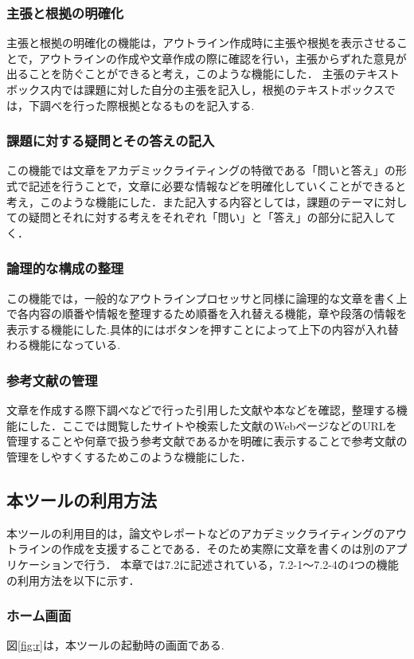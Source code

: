 \documentclass[a4j,12pt]{jarticle}
\begin{document}
\subsubsection{主張と根拠の明確化}
主張と根拠の明確化の機能は，アウトライン作成時に主張や根拠を表示させることで，アウトラインの作成や文章作成の際に確認を行い，主張からずれた意見が出ることを防ぐことができると考え，このような機能にした．
主張のテキストボックス内では課題に対した自分の主張を記入し，根拠のテキストボックスでは，下調べを行った際根拠となるものを記入する.

\subsubsection{課題に対する疑問とその答えの記入}
この機能では文章をアカデミックライティングの特徴である「問いと答え」の形式で記述を行うことで，文章に必要な情報などを明確化していくことができると考え，このような機能にした．また記入する内容としては，課題のテーマに対しての疑問とそれに対する考えをそれぞれ「問い」と「答え」の部分に記入してく．

\subsubsection{論理的な構成の整理}
この機能では，一般的なアウトラインプロセッサと同様に論理的な文章を書く上で各内容の順番や情報を整理するため順番を入れ替える機能，章や段落の情報を表示する機能にした.具体的にはボタンを押すことによって上下の内容が入れ替わる機能になっている.

\subsubsection{参考文献の管理}
文章を作成する際下調べなどで行った引用した文献や本などを確認，整理する機能にした．ここでは閲覧したサイトや検索した文献のWebページなどのURLを管理することや何章で扱う参考文献であるかを明確に表示することで参考文献の管理をしやすくするためこのような機能にした．
\newpage

\subsection{本ツールの利用方法}
本ツールの利用目的は，論文やレポートなどのアカデミックライティングのアウトラインの作成を支援することである．そのため実際に文章を書くのは別のアプリケーションで行う．
本章では7.2に記述されている，7.2-1〜7.2-4の4つの機能の利用方法を以下に示す．

\subsubsection{ホーム画面}
図\ref{fig:r}は，本ツールの起動時の画面である.
\end{document}
